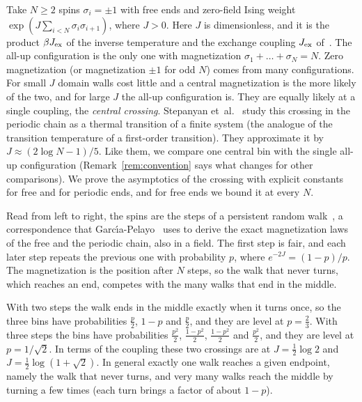 \documentclass[11pt]{article}
\theoremstyle{definition}
\theoremstyle{remark}
\begin{document}
Take $N\ge2$ spins $\sigma_i=\pm1$ with free ends and zero-field Ising
weight $\exp(J\sum_{i<N}\sigma_i\sigma_{i+1})$, where $J>0$. Here $J$ is
dimensionless, and it is the product $\beta J_{\rm ex}$ of the inverse temperature and
the exchange coupling $J_{\rm ex}$ of~\cite{stepanyan2024}. The all-up
configuration is the only one with magnetization $\sigma_1+\dots+\sigma_N=N$.
Zero magnetization (or magnetization $\pm1$ for odd $N$) comes from many configurations. For small $J$ domain walls cost
little and a central magnetization is the more likely of the two, and for large $J$
the all-up configuration is. They are equally likely at a single coupling,
the \emph{central crossing}. Stepanyan et~al.\@~\cite{stepanyan2024} study
this crossing in the periodic chain as a thermal transition of a finite
system (the analogue of the transition temperature of a first-order
transition). They approximate it by $J\approx(2\log N-1)/5$. Like them, we compare one
central bin with the single all-up configuration (Remark~\ref{rem:convention}
says what changes for other comparisons). We prove the asymptotics of the crossing with
explicit constants for free and for periodic ends, and for free ends we bound
it at every $N$.

Read from left to right, the spins are the steps of a persistent random
walk~\cite{goldstein1951,gillis1955}, a correspondence that
Garc\'{\i}a-Pelayo~\cite{garciapelayo2009} uses to derive the exact
magnetization laws of the free and the periodic chain, also in a field. The first step is fair, and
each later step repeats the previous one with probability $p$, where
$e^{-2J}=(1-p)/p$. The magnetization is the position after $N$ steps, so the
walk that never turns, which reaches an end, competes with the many walks
that end in the middle.

With two steps the walk ends in the middle exactly when it turns once, so the
three bins have probabilities $\frac p2$, $1-p$ and $\frac p2$, and they are
level at $p=\frac23$. With three steps the bins have probabilities
$\frac{p^2}2$, $\frac{1-p^2}2$, $\frac{1-p^2}2$ and $\frac{p^2}2$, and they are
level at $p=1/\sqrt2$. In terms of the coupling these two crossings are at
$J=\frac12\log2$ and $J=\frac12\log(1+\sqrt2)$. In general exactly one walk reaches a given endpoint,
namely the walk that never turns, and very many walks reach the middle by
turning a few times (each turn brings a factor of about $1-p$).
\end{document}
